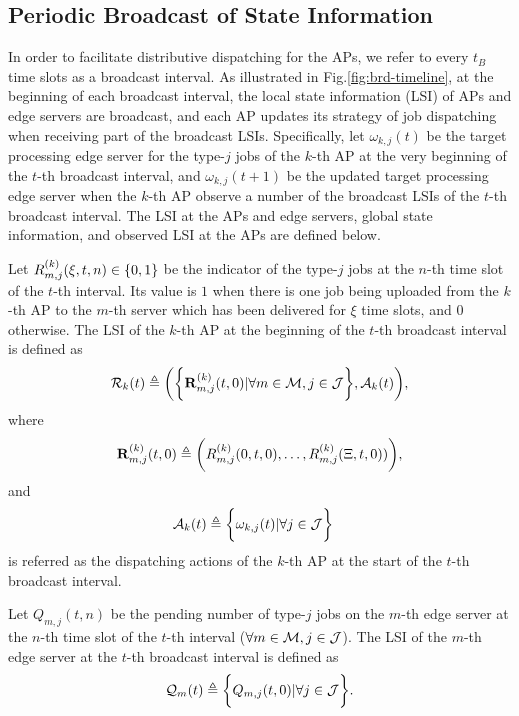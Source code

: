 \subsection{Periodic Broadcast of State Information}
\label{subsec:broadcast}
In order to facilitate distributive dispatching for the APs, we refer to every $t_B$ time slots as a broadcast interval.
As illustrated in Fig.\ref{fig:brd-timeline}, at the beginning of each broadcast interval, the local state information (LSI) of APs and edge servers are broadcast, and each AP updates its strategy of job dispatching when receiving part of the broadcast LSIs.
Specifically, let $\omega_{k,j}(t)$ be the target processing edge server for the type-$j$ jobs of the $k$-th AP at the very beginning of the $t$-th broadcast interval, and $\omega_{k,j}(t+1)$ be the updated target processing edge server when the $k$-th AP observe a number of the broadcast LSIs of the $t$-th broadcast interval.
The LSI at the APs and edge servers, global state information, and observed LSI at the APs are defined below.

\begin{definition}
    Let $R^{(k)}_{m,j}(\xi,t,n) \in \{0,1\}$ be the indicator of the type-$j$ jobs at the $n$-th time slot of the $t$-th interval.
    Its value is $1$ when there is one job being uploaded from the $k$-th AP to the $m$-th server which has been delivered for $\xi$ time slots, and $0$ otherwise. 
    The LSI of the $k$-th AP at the beginning of the $t$-th broadcast interval is defined as
    {\small
    \begin{align}
        \mathcal{R}_{k}(t) \triangleq
        \bigg(
            \bigg\{\mathbf{R}^{(k)}_{m,j}(t,0) | \forall m\in\mathcal{M},j\in\mathcal{J}\bigg\},
            \mathcal{A}_{k}(t)
        \bigg),
    \end{align}
    }
    where
    \begin{align}
        \mathbf{R}^{(k)}_{m,j}(t,0) \triangleq \bigg(
            R^{(k)}_{m,j}(0,t,0), \dots, R^{(k)}_{m,j}(\Xi,t,0) )
        \bigg),
    \end{align}
    and
    \begin{align}
        \mathcal{A}_{k}(t) &\triangleq \bigg\{\omega_{k,j}(t) | \forall j\in\mathcal{J}\bigg\}
    \end{align}
    is referred as the dispatching actions of the $k$-th AP at the start of the $t$-th broadcast interval.
\end{definition}

\begin{definition}
    Let $Q_{m,j}({t,n})$ be the pending number of type-$j$ jobs on the $m$-th edge server at the $n$-th time slot of the $t$-th interval ($\forall m\in\mathcal{M}, j\in\mathcal{J}$).
    The LSI of the $m$-th edge server at the $t$-th broadcast interval is defined as
    \begin{align}
        \mathcal{Q}_{m}(t) \triangleq \bigg\{
            Q_{m,j}(t, 0) | \forall j\in\mathcal{J}
        \bigg\}.
    \end{align}
\end{definition}

